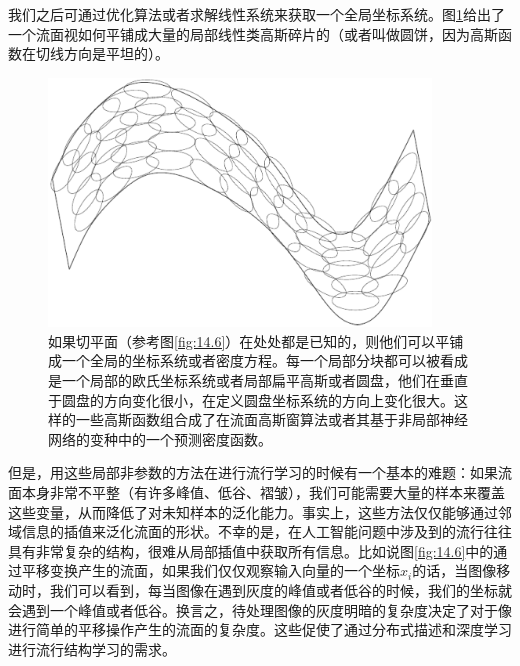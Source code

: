 我们之后可通过优化算法或者求解线性系统来获取一个全局坐标系统。图\ref{fig:14.9}给出了一个流面视如何平铺成大量的局部线性类高斯碎片的（或者叫做圆饼，因为高斯函数在切线方向是平坦的）。
\begin{figure}[htbp] %
   \centering
   \includegraphics[width=4in]{fig/chap14/14_9.png} 
   \caption{如果切平面（参考图\ref{fig:14.6}）在处处都是已知的，则他们可以平铺成一个全局的坐标系统或者密度方程。每一个局部分块都可以被看成是一个局部的欧氏坐标系统或者局部扁平高斯或者圆盘，他们在垂直于圆盘的方向变化很小，在定义圆盘坐标系统的方向上变化很大。这样的一些高斯函数组合成了在流面高斯窗算法或者其基于非局部神经网络的变种中的一个预测密度函数。}
   \label{fig:14.9}
\end{figure}

但是，用这些局部非参数的方法在进行流行学习的时候有一个基本的难题：如果流面本身非常不平整（有许多峰值、低谷、褶皱），我们可能需要大量的样本来覆盖这些变量，从而降低了对未知样本的泛化能力。事实上，这些方法仅仅能够通过邻域信息的插值来泛化流面的形状。不幸的是，在人工智能问题中涉及到的流行往往具有非常复杂的结构，很难从局部插值中获取所有信息。比如说图\ref{fig:14.6}中的通过平移变换产生的流面，如果我们仅仅观察输入向量的一个坐标$x_i$的话，当图像移动时，我们可以看到，每当图像在遇到灰度的峰值或者低谷的时候，我们的坐标就会遇到一个峰值或者低谷。换言之，待处理图像的灰度明暗的复杂度决定了对于像进行简单的平移操作产生的流面的复杂度。这些促使了通过分布式描述和深度学习进行流行结构学习的需求。